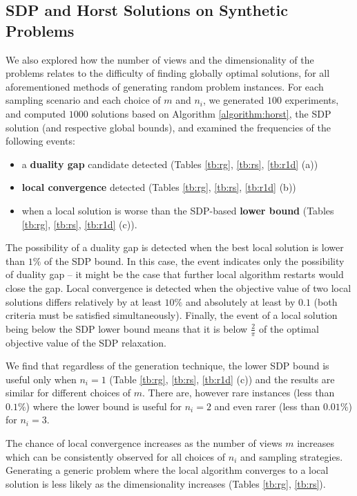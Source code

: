 \subsection{SDP and Horst Solutions on Synthetic Problems}\label{chap:experiments:horst}

We also explored how the number of views and the dimensionality of
the problems relates to the difficulty of finding globally optimal
solutions, for all aforementioned methods of generating random problem
instances.
 For each sampling scenario and each choice of $m$ and $n_i$, we generated $100$
experiments, and computed $1000$ solutions based on Algorithm
\ref{algorithm:horst}, the SDP solution (and respective
global bounds), and examined the frequencies of the following
events:
\begin{itemize}
\item a \textbf{duality gap} candidate detected (Tables
\ref{tb:rg}, \ref{tb:rs}, \ref{tb:r1d} (a))
\item \textbf{local convergence} detected (Tables \ref{tb:rg}, \ref{tb:rs},
\ref{tb:r1d} (b))
\item when a local solution is worse
than the SDP-based \textbf{lower bound} (Tables \ref{tb:rg},
\ref{tb:rs}, \ref{tb:r1d} (c)).
\end{itemize}
The possibility of a duality gap is
detected when the best local solution is lower than $1\%$ of the
SDP bound. In this case, the event indicates only the possibility
of duality gap -- it might be the case that further local
algorithm restarts would close the gap. Local convergence
is detected when the objective value of two local solutions
differs relatively by at least $10\%$ and absolutely at least by
$0.1$ (both criteria must be satisfied
simultaneously). Finally, the event of a local solution being
below the SDP lower bound means that it is below
$\frac{2}{\pi}$ of the optimal objective value of the SDP
relaxation.

We find that regardless of the generation technique, the lower
SDP bound is useful only when $n_i = 1$ (Table \ref{tb:rg},
\ref{tb:rs}, \ref{tb:r1d} (c)) and the results are similar for
different choices of $m$. There are, however rare instances (less
than $0.1\%$) where the lower bound is useful for $n_i = 2$ and
even rarer (less than $0.01\%$) for $n_i = 3$.

The chance of local convergence increases as the number of views
$m$ increases which can be consistently observed for all choices
of $n_i$ and sampling strategies. Generating a generic  problem where the
local algorithm  converges to a local solution is less
likely as the dimensionality increases
(Tables \ref{tb:rg}, \ref{tb:rs}).

